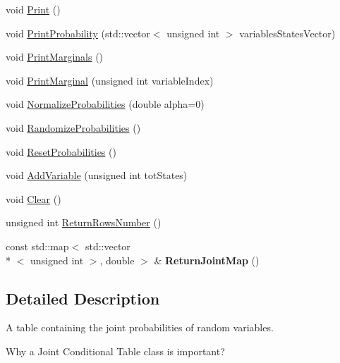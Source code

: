 \begin{DoxyCompactItemize}
\item 
void \hyperlink{classbayonet_1_1_joint_probability_table_ade691120f2a61325b94a7f9e85dd21f8}{Print} ()
\item 
void \hyperlink{classbayonet_1_1_joint_probability_table_ac52835cb75b2d635b51843abf58311a9}{Print\-Probability} (std\-::vector$<$ unsigned int $>$ variables\-States\-Vector)
\item 
void \hyperlink{classbayonet_1_1_joint_probability_table_a73e7e3843c63192e37d11bd9916f0587}{Print\-Marginals} ()
\item 
void \hyperlink{classbayonet_1_1_joint_probability_table_ada1f39508ba6a128d9f0405efe1257a7}{Print\-Marginal} (unsigned int variable\-Index)
\item 
void \hyperlink{classbayonet_1_1_joint_probability_table_a7f89dc909bd3fc68ba0859ce4b6f130c}{Normalize\-Probabilities} (double alpha=0)
\item 
void \hyperlink{classbayonet_1_1_joint_probability_table_a91133b2cf610076459a641b458c898cd}{Randomize\-Probabilities} ()
\item 
void \hyperlink{classbayonet_1_1_joint_probability_table_a1d099395c21a1ec57df4ffbaa1b85484}{Reset\-Probabilities} ()
\item 
void \hyperlink{classbayonet_1_1_joint_probability_table_a34def84ddda0e58303d552055057b884}{Add\-Variable} (unsigned int tot\-States)
\item 
void \hyperlink{classbayonet_1_1_joint_probability_table_a61a82adc62427272e5aa84ace3fc15a6}{Clear} ()
\item 
unsigned int \hyperlink{classbayonet_1_1_joint_probability_table_af87920fcfa20657c2c3eb816a77ea66b}{Return\-Rows\-Number} ()
\item 
\hypertarget{classbayonet_1_1_joint_probability_table_a6172ff11f3cc9e2f6eb0ae42eb3fcb47}{const std\-::map$<$ std\-::vector\\*
$<$ unsigned int $>$, double $>$ \& {\bfseries Return\-Joint\-Map} ()}\label{classbayonet_1_1_joint_probability_table_a6172ff11f3cc9e2f6eb0ae42eb3fcb47}

\end{DoxyCompactItemize}


\subsection{Detailed Description}
A table containing the joint probabilities of random variables. 

Why a Joint Conditional Table class is important?

